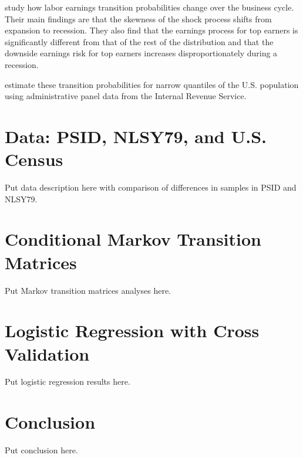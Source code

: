 \documentclass[letterpaper,12pt]{article}
\theoremstyle{definition}
\begin{document}
\begin{spacing}{1.5}
  \citet{GuvenenEtAl:2014} study how labor earnings transition probabilities change over the business cycle. Their main findings are that the skewness of the shock process shifts from expansion to recession. They also find that the earnings process for top earners is significantly different from that of the rest of the distribution and that the downside earnings risk for top earners increases disproportionately during a recession.

  \citet{DeBackerRamnath:2019} estimate these transition probabilities for narrow quantiles of the U.S. population using administrative panel data from the Internal Revenue Service.


\section{Data: PSID, NLSY79, and U.S. Census}\label{SecData}

  Put data description here with comparison of differences in samples in PSID and NLSY79.


\section{Conditional Markov Transition Matrices}\label{SecMarkov}

  Put Markov transition matrices analyses here.


\section{Logistic Regression with Cross Validation}\label{SecLogit}

  Put logistic regression results here.


\section{Conclusion}\label{SecConclusion}

  Put conclusion here.


\end{spacing}


\newpage





\end{document}
